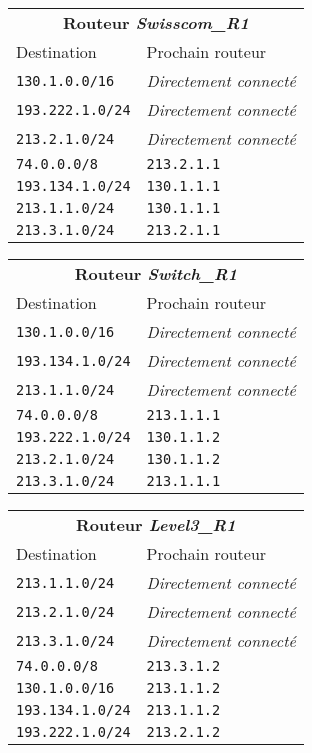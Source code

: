 \documentclass[11pt,a4paper]{article}
\begin{document}
\begin{tabular}{|ll|}
	\hline
	\multicolumn{2}{|c|}{\textbf{Routeur \textit{Swisscom\_R1}}} \\
	Destination & Prochain routeur \\
	\hline
	\texttt{130.1.0.0/16} & \textit{Directement connecté} \\
	\texttt{193.222.1.0/24} & \textit{Directement connecté} \\
	\texttt{213.2.1.0/24} & \textit{Directement connecté} \\
	\texttt{74.0.0.0/8} & \texttt{213.2.1.1} \\
	\texttt{193.134.1.0/24} & \texttt{130.1.1.1} \\
	\texttt{213.1.1.0/24} & \texttt{130.1.1.1} \\
	\texttt{213.3.1.0/24} & \texttt{213.2.1.1} \\
	\hline
\end{tabular}
\quad
\begin{tabular}{|ll|}
	\hline
	\multicolumn{2}{|c|}{\textbf{Routeur \textit{Switch\_R1}}} \\
	Destination & Prochain routeur \\
	\hline
	\texttt{130.1.0.0/16} & \textit{Directement connecté} \\
	\texttt{193.134.1.0/24} & \textit{Directement connecté} \\
	\texttt{213.1.1.0/24} & \textit{Directement connecté} \\
	\texttt{74.0.0.0/8} & \texttt{213.1.1.1} \\
	\texttt{193.222.1.0/24} & \texttt{130.1.1.2} \\
	\texttt{213.2.1.0/24} & \texttt{130.1.1.2} \\
	\texttt{213.3.1.0/24} & \texttt{213.1.1.1} \\
	\hline
\end{tabular}

\vspace{0.3cm}

\begin{tabular}{|ll|}
	\hline
	\multicolumn{2}{|c|}{\textbf{Routeur \textit{Level3\_R1}}} \\
	Destination & Prochain routeur \\
	\hline
	\texttt{213.1.1.0/24} & \textit{Directement connecté} \\
	\texttt{213.2.1.0/24} & \textit{Directement connecté} \\
	\texttt{213.3.1.0/24} & \textit{Directement connecté} \\
	\texttt{74.0.0.0/8} & \texttt{213.3.1.2} \\
	\texttt{130.1.0.0/16} & \texttt{213.1.1.2} \\
	\texttt{193.134.1.0/24} & \texttt{213.1.1.2} \\
	\texttt{193.222.1.0/24} & \texttt{213.2.1.2} \\
	\hline
\end{tabular}
\end{document}
